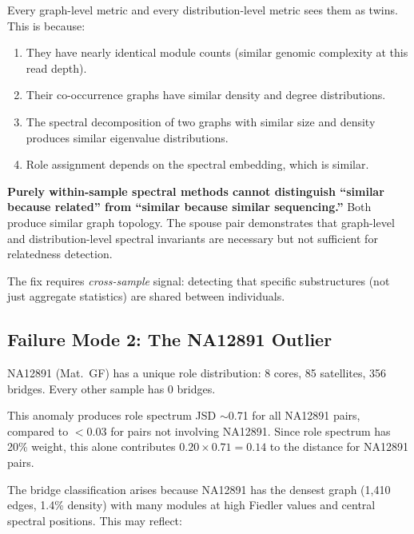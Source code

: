 \documentclass{../yalumba}
\begin{document}

Every graph-level metric and every distribution-level metric sees them as
twins.  This is because:

\begin{enumerate}
  \item They have nearly identical module counts (similar genomic complexity at
    this read depth).
  \item Their co-occurrence graphs have similar density and degree distributions.
  \item The spectral decomposition of two graphs with similar size and density
    produces similar eigenvalue distributions.
  \item Role assignment depends on the spectral embedding, which is similar.
\end{enumerate}

\begin{limitation}
\textbf{Purely within-sample spectral methods cannot distinguish ``similar
because related'' from ``similar because similar sequencing.''} Both produce
similar graph topology.  The spouse pair demonstrates that graph-level and
distribution-level spectral invariants are necessary but not sufficient for
relatedness detection.
\end{limitation}

The fix requires \emph{cross-sample} signal: detecting that specific
substructures (not just aggregate statistics) are shared between individuals.

\subsection{Failure Mode 2: The NA12891 Outlier}

NA12891 (Mat.~GF) has a unique role distribution: 8 cores, 85 satellites, 356
bridges.  Every other sample has 0 bridges.

This anomaly produces role spectrum JSD $\sim$0.71 for all NA12891 pairs,
compared to $< 0.03$ for pairs not involving NA12891.  Since role spectrum has
20\% weight, this alone contributes $0.20 \times 0.71 = 0.14$ to the distance
for NA12891 pairs.


The bridge classification arises because NA12891 has the densest graph (1{,}410
edges, 1.4\% density) with many modules at high Fiedler values and central
spectral positions.  This may reflect:
\end{document}
